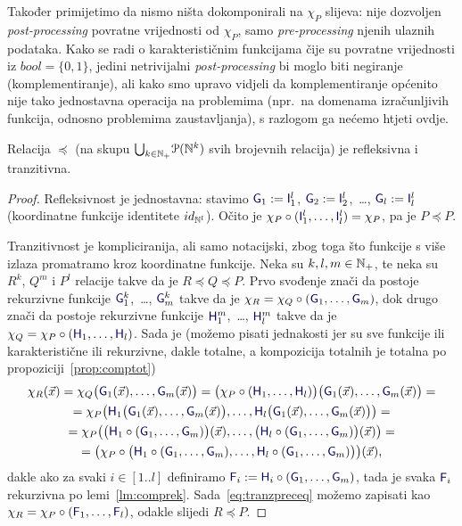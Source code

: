 Također primijetimo da nismo ništa dokomponirali na $\chi_P$ slijeva: nije dozvoljen \emph{post-processing} povratne vrijednosti od $\chi_P$, samo \emph{pre-processing} njenih ulaznih podataka. Kako se radi o karakterističnim funkcijama čije su povratne vrijednosti iz $bool=\{0,1\}$, jedini netrivijalni \emph{post-processing} bi moglo biti negiranje (komplementiranje), ali kako smo upravo vidjeli da komplementiranje općenito nije tako jednostavna operacija na problemima (npr.\ na domenama izračunljivih funkcija, odnosno problemima zaustavljanja), s razlogom ga nećemo htjeti ovdje.

\begin{propozicija}[{name=[refleksivnost i tranzitivnost svedivosti]}]\label{pp:preceqrt}
Relacija $\preceq$ (na skupu $\bigcup_{k\in{\mathbb N}_+}\!\mathcal P({\mathbb N}^k)$ svih brojevnih relacija) je refleksivna i tranzitivna.
\end{propozicija}
\begin{proof}
Refleksivnost je jednostavna: stavimo $\f G_1:=\f I_1^l$, $\f G_2:=\f I_2^l$,~\ldots, $\f G_l:=\f I_l^l$ (koordinatne funkcije identitete $id_{{\mathbb N}^l}$). Očito je $\chi_P\circ(\f I_1^l,\dotsc,\f I_l^l)=\chi_P$, pa je $P\preceq P$.

Tranzitivnost je kompliciranija, ali samo notacijski, zbog toga što funkcije s više izlaza promatramo kroz koordinatne funkcije. Neka su $k,l,m\in{\mathbb N}_+$, te neka su $R^k$, $Q^m$ i $P^l$ relacije takve da je $R\preceq Q\preceq P$. Prvo svođenje znači da postoje rekurzivne funkcije $\f G_1^k$,~\ldots, $\f G_m^k$ takve da je $\chi_R=\chi_Q\circ(\f G_1,\dotsc,\f G_m)$, dok drugo znači da postoje rekurzivne funkcije $\f H_1^m$,~\ldots, $\f H_l^m$ takve da je $\chi_Q=\chi_P\circ(\f H_1,\dotsc,\f H_l)$. Sada je (možemo pisati jednakosti jer su sve funkcije ili karakteristične ili rekurzivne, dakle totalne, a kompozicija totalnih je totalna po propoziciji~\ref{prop:comptot})
\begin{multline}\label{eq:tranzpreceq}
    \chi_R(\vec x)=\chi_Q\bigl(\f G_1(\vec x),\dotsc,\f G_m(\vec x)\bigr)=\bigl(\chi_P\circ(\f H_1,\dotsc,\f H_l)\bigr)\bigl(\f G_1(\vec x),\dotsc,\f G_m(\vec x)\bigr)=\\
    =\chi_P\bigl(
    \f H_1\bigl(\f G_1(\vec x),\dotsc,\f G_m(\vec x)\bigr),\dotsc,
    \f H_l\bigl(\f G_1(\vec x),\dotsc,\f G_m(\vec x)\bigr)
    \bigr)=\\
    =\chi_P\bigl(
    \bigl(\f H_1\circ(\f G_1,\dotsc,\f G_m)\bigr)(\vec x),\dotsc,
    \bigl(\f H_l\circ(\f G_1,\dotsc,\f G_m)\bigr)(\vec x)\bigr)=\\
    =\bigl(\chi_P\circ\bigl(\f H_1\circ(\f G_1,\dotsc,\f G_m),\dotsc,\f H_l\circ(\f G_1,\dotsc,\f G_m)\bigr)\bigr)(\vec x)\text,
\end{multline}
dakle ako za svaki $i\in[1..l]$ definiramo $\f F_i:=\f H_i\circ(\f G_1,\dotsc,\f G_m)$, tada je svaka $\f F_i$ rekurzivna po lemi~\ref{lm:comprek}. Sada~\eqref{eq:tranzpreceq} možemo zapisati kao $\chi_R=\chi_P\circ(\f F_1,\dotsc,\f F_l)$, odakle slijedi $R\preceq P$.
\end{proof}


